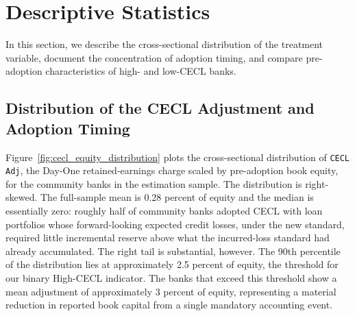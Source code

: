 
\section{Descriptive Statistics}
\label{sec:descriptive}

In this section, we describe the cross-sectional distribution of the treatment
variable, document the concentration of adoption timing, and compare pre-adoption
characteristics of high- and low-CECL banks.  

\subsection{Distribution of the CECL Adjustment and Adoption Timing}
\label{sec:descriptive:distribution}

Figure~\ref{fig:cecl_equity_distribution} plots the cross-sectional distribution
of \texttt{CECL Adj}, the Day-One retained-earnings charge scaled by pre-adoption
book equity, for the community banks in the estimation sample.  The
distribution is right-skewed.  The full-sample mean is 0.28 percent of equity and
the median is essentially zero: roughly half of community banks adopted CECL with
loan portfolios whose forward-looking expected credit losses, under the new
standard, required little incremental reserve above what the incurred-loss
standard had already accumulated.  The right tail is substantial, however.  The
90th percentile of the distribution lies at approximately 2.5 percent of equity,
the threshold for our binary High-CECL indicator.  The banks that exceed
this threshold show a mean adjustment of approximately 3 percent of equity,
representing a material reduction in reported book capital from a single
mandatory accounting event.


